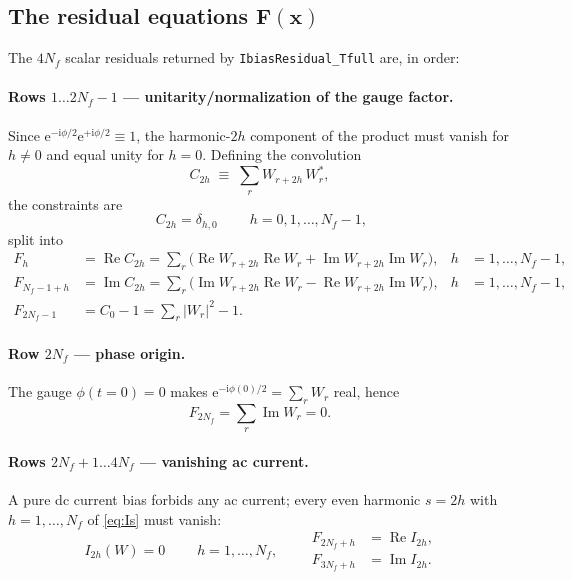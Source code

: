 \documentclass[11pt,a4paper]{article}
\newcommand{\ii}{\mathrm{i}}
\newcommand{\ee}{\mathrm{e}}
\newcommand{\Real}{\operatorname{Re}}
\newcommand{\Imag}{\operatorname{Im}}
\newcommand{\Wm}{W}
\begin{document}
\subsection{The residual equations $\mathbf F(\mathbf x)$}

The $4N_f$ scalar residuals returned by \texttt{IbiasResidual\_Tfull} are, in order:

\paragraph{Rows $1\ldots 2N_f-1$ --- unitarity/normalization of the gauge factor.}
Since $\ee^{-\ii\phi/2}\ee^{+\ii\phi/2}\equiv1$, the harmonic-$2h$ component of the
product must vanish for $h\neq0$ and equal unity for $h=0$.  Defining the
convolution
\begin{equation}
  C_{2h} \;\equiv\; \sum_{r} \Wm_{r+2h}\,\Wm^{*}_{r},
  \label{eq:Cdef}
\end{equation}
the constraints are
\begin{equation}
  \boxed{\;C_{2h}=\delta_{h,0}\;}\qquad h=0,1,\dots,N_f-1,
  \label{eq:unitarity_explicit}
\end{equation}
split into
\begin{align}
  F_{h}        &= \Real C_{2h} = \sum_r\big(\Real \Wm_{r+2h}\Real \Wm_r+\Imag \Wm_{r+2h}\Imag \Wm_r\big),
                 & h&=1,\dots,N_f-1, \label{eq:F_reC}\\
  F_{N_f-1+h}  &= \Imag C_{2h} = \sum_r\big(\Imag \Wm_{r+2h}\Real \Wm_r-\Real \Wm_{r+2h}\Imag \Wm_r\big),
                 & h&=1,\dots,N_f-1, \label{eq:F_imC}\\
  F_{2N_f-1}   &= C_0-1 = \sum_r|\Wm_r|^2-1. \label{eq:F_norm}
\end{align}

\paragraph{Row $2N_f$ --- phase origin.}
The gauge $\phi(t{=}0)=0$ makes $\ee^{-\ii\phi(0)/2}=\sum_r \Wm_r$ real, hence
\begin{equation}
  F_{2N_f} = \sum_r \Imag \Wm_r = 0.
  \label{eq:F_gauge}
\end{equation}

\paragraph{Rows $2N_f+1\ldots 4N_f$ --- vanishing ac current.}
A pure dc current bias forbids any ac current; every even harmonic $s=2h$ with
$h=1,\dots,N_f$ of \eqref{eq:Is} must vanish:
\begin{equation}
  \boxed{\;I_{2h}(\Wm)=0\;}\qquad h=1,\dots,N_f,
  \qquad
  \begin{aligned}
    F_{2N_f+h} &= \Real I_{2h},\\
    F_{3N_f+h} &= \Imag I_{2h}.
  \end{aligned}
  \label{eq:F_current}
\end{equation}
\end{document}
